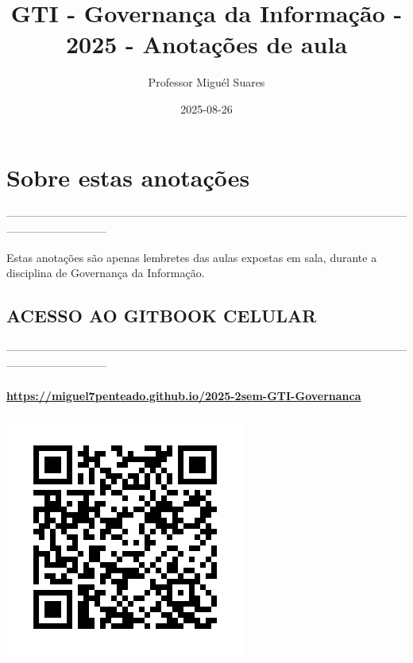 \documentclass[
]{book}
\title{GTI - Governança da Informação - 2025 - Anotações de aula}
\author{Professor Miguél Suares}
\date{2025-08-26}
\begin{document}
\maketitle

{
\setcounter{tocdepth}{1}
\tableofcontents
}
\chapter*{Sobre estas anotações}\label{sobre-estas-anotauxe7uxf5es}

---------------------------------------------------------------------------------------------------------------------------------------

Estas anotações são apenas lembretes das aulas expostas em sala, durante a disciplina de Governança da Informação.

\section{ACESSO AO GITBOOK CELULAR}\label{acesso-ao-gitbook-celular}

---------------------------------------------------------------------------------------------------------------------------------------

\subsubsection{\texorpdfstring{\url{https://miguel7penteado.github.io/2025-2sem-GTI-Governanca}}{https://miguel7penteado.github.io/2025-2sem-GTI-Governanca}}\label{httpsmiguel7penteado.github.io2025-2sem-gti-governanca}

\includegraphics{images/qr-code-disciplina.jpg}
\end{document}
